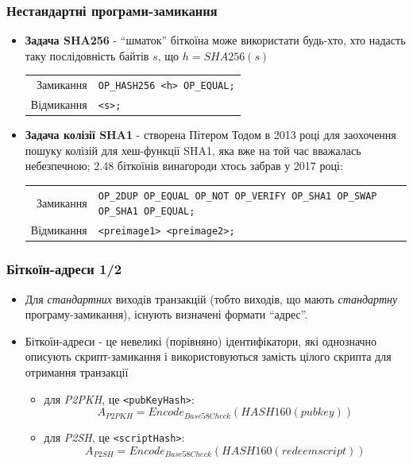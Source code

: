 \documentclass{beamer}
\begin{document}
\begin{frame}[fragile]
  \frametitle{Нестандартні програми-замикання}
  \begin{itemize}
  \item \textbf{Задача SHA256} - ``шматок'' біткоїна може використати будь-хто,
    хто надасть таку послідовність байтів $s$, що $h = SHA256(s)$
    \break
    \begin{tabular}{rl}
      Замикання &\tiny\texttt{OP_HASH256 <h> OP_EQUAL;} \\
      Відмикання &\tiny\texttt{<s>;} \\
    \end{tabular}
  \item \textbf{Задача колізії SHA1} - створена Пітером Тодом в 2013 році для
    заохочення пошуку колізій для хеш-функції SHA1, яка вже на той час вважалась
    небезпечною; 2.48 біткоїнів винагороди хтось забрав у 2017 році:
    \break
    \begin{tabular}{rl}
      Замикання &\tiny\texttt{OP_2DUP OP_EQUAL OP_NOT OP_VERIFY OP_SHA1 OP_SWAP OP_SHA1 OP_EQUAL;} \\
      Відмикання &\tiny\texttt{<preimage1> <preimage2>;} \\
    \end{tabular}
  \end{itemize}
\end{frame}

\begin{frame}[fragile]
  \frametitle{Біткоїн-адреси 1/2}
  \begin{itemize}
  \item Для \textit{стандартних} виходів транзакцій (тобто виходів, що мають
    \textit{стандартну} програму-замикання), існують визначені формати ``адрес''.    
  \item Біткоїн-адреси - це невеликі (порівняно) ідентифікатори, які однозначно
    описують скрипт-замикання і використовуються замість цілого скрипта для
    отримання транзакції
    \begin{itemize}
    \item для \textit{P2PKH}, це \texttt{<pubKeyHash>}:
      $$A_{P2PKH} = Encode_{Base58Check}(HASH160(pubkey))$$
    \item для \textit{P2SH}, це \texttt{<scriptHash>}:
      $$A_{P2SH} = Encode_{Base58Check}(HASH160(redeemscript))$$
    \end{itemize}
  \end{itemize}
\end{frame}
\end{document}
